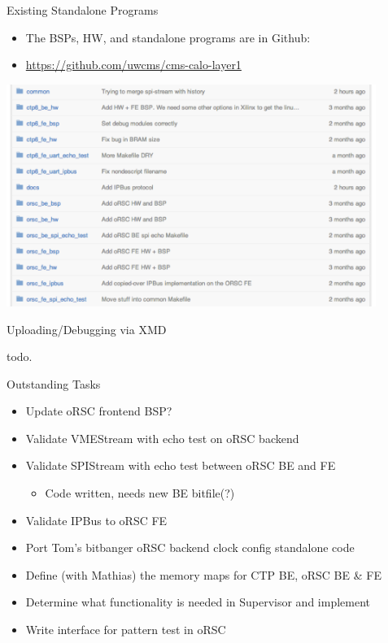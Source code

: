 \documentclass{beamer}
\begin{document}
\begin{frame}{Existing Standalone Programs}
\begin{itemize}
\item The BSPs, HW, and standalone programs are in Github:
\item \url{https://github.com/uwcms/cms-calo-layer1}
\end{itemize}
\begin{center}
\includegraphics[width=0.9\textwidth]{images/standalone_packages.pdf}
\end{center}
\end{frame}

\begin{frame}{Uploading/Debugging via XMD}
\begin{center}
todo.
\end{center}
\end{frame}

\begin{frame}{Outstanding Tasks}
\begin{itemize}
    \item Update oRSC frontend BSP?
    \item Validate VMEStream with echo test on oRSC backend
    \item Validate SPIStream with echo test between oRSC BE and FE
\begin{itemize}
    \item Code written, needs new BE bitfile(?)
\end{itemize}
    \item Validate IPBus to oRSC FE
    \item Port Tom's bitbanger oRSC backend clock config standalone code
    \item Define (with Mathias) the memory maps for CTP BE, oRSC BE \& FE
    \item Determine what functionality is needed in Supervisor and implement
    \item Write interface for pattern test in oRSC
\end{itemize}
\end{frame}
\end{document}
